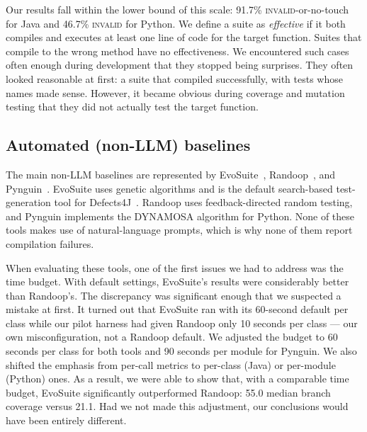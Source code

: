 Our results fall within the lower bound of this scale: 91.7\% \textsc{invalid}-or-no-touch
for Java and 46.7\% \textsc{invalid} for Python. We define a suite as \emph{effective} if
it both compiles and executes at least one line of code for the target function. Suites
that compile to the wrong method have no effectiveness. We encountered such cases often
enough during development that they stopped being surprises. They often looked reasonable
at first: a suite that compiled successfully, with tests whose names made sense. However,
it became obvious during coverage and mutation testing that they did not actually test
the target function.

\subsection{Automated (non-LLM) baselines}\label{sec:rel-baselines}
The main non-LLM baselines are represented by EvoSuite~\cite{fraser2011evosuite},
Randoop~\cite{pacheco2007randoop}, and Pynguin~\cite{lukasczyk2022pynguin}. EvoSuite uses
genetic algorithms and is the default search-based test-generation tool for
Defects4J~\cite{ouedraogo2025prompt,gu2025template,broide2026evogpt}. Randoop uses
feedback-directed random testing, and Pynguin implements the DYNAMOSA algorithm for
Python. None of these tools makes use of natural-language prompts, which is why none of
them report compilation failures.

When evaluating these tools, one of the first issues we had to address was the time
budget. With default settings, EvoSuite's results were considerably better than Randoop's.
The discrepancy was significant enough that we suspected a mistake at first. It turned out
that EvoSuite ran with its 60-second default per class while our pilot harness had given
Randoop only 10 seconds per class --- our own misconfiguration, not a Randoop default. We
adjusted the budget to 60 seconds per class for both tools and 90 seconds
per module for Pynguin. We also shifted the emphasis from per-call metrics to per-class
(Java) or per-module (Python) ones. As a result, we were able to show that, with a
comparable time budget, EvoSuite significantly outperformed Randoop: 55.0 median branch
coverage versus 21.1. Had we not made this adjustment, our conclusions would have been
entirely different.

